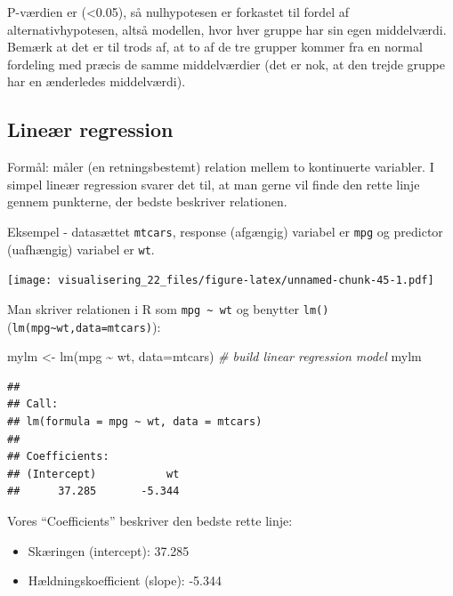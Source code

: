 \documentclass[
]{book}
\newenvironment{Shaded}{\begin{snugshade}}{\end{snugshade}}
\newcommand{\AttributeTok}[1]{\textcolor[rgb]{0.77,0.63,0.00}{#1}}
\newcommand{\CommentTok}[1]{\textcolor[rgb]{0.56,0.35,0.01}{\textit{#1}}}
\newcommand{\FunctionTok}[1]{\textcolor[rgb]{0.00,0.00,0.00}{#1}}
\newcommand{\NormalTok}[1]{#1}
\newcommand{\OtherTok}[1]{\textcolor[rgb]{0.56,0.35,0.01}{#1}}
\newcommand{\SpecialCharTok}[1]{\textcolor[rgb]{0.00,0.00,0.00}{#1}}
\providecommand{\tightlist}{%
  \setlength{\itemsep}{0pt}\setlength{\parskip}{0pt}}
\begin{document}
P-værdien er (\textless0.05), så nulhypotesen er forkastet til fordel af alternativhypotesen, altså modellen, hvor hver gruppe har sin egen middelværdi. Bemærk at det er til trods af, at to af de tre grupper kommer fra en normal fordeling med præcis de samme middelværdier (det er nok, at den trejde gruppe har en ænderledes middelværdi).

\hypertarget{lineuxe6r-regression}{%
\subsection{Lineær regression}\label{lineuxe6r-regression}}

Formål: måler (en retningsbestemt) relation mellem to kontinuerte variabler. I simpel lineær regression svarer det til, at man gerne vil finde den rette linje gennem punkterne, der bedste beskriver relationen.

Eksempel - datasættet \texttt{mtcars}, response (afgængig) variabel er \texttt{mpg} og predictor (uafhængig) variabel er \texttt{wt}.

\texttt{[image: visualisering\_22\_files/figure-latex/unnamed-chunk-45-1.pdf]}

Man skriver relationen i R som \texttt{mpg\ \textasciitilde{}\ wt} og benytter \texttt{lm()}(\texttt{lm(mpg\textasciitilde{}wt,data=mtcars)}):

\begin{Shaded}
\begin{Highlighting}[]
\NormalTok{mylm }\OtherTok{\textless{}{-}} \FunctionTok{lm}\NormalTok{(mpg }\SpecialCharTok{\textasciitilde{}}\NormalTok{ wt, }\AttributeTok{data=}\NormalTok{mtcars)  }\CommentTok{\# build linear regression model}
\NormalTok{mylm}
\end{Highlighting}
\end{Shaded}

\begin{verbatim}
## 
## Call:
## lm(formula = mpg ~ wt, data = mtcars)
## 
## Coefficients:
## (Intercept)           wt  
##      37.285       -5.344
\end{verbatim}

Vores ``Coefficients'' beskriver den bedste rette linje:

\begin{itemize}
\tightlist
\item
  Skæringen (intercept): 37.285
\item
  Hældningskoefficient (slope): -5.344
\end{itemize}
\end{document}
